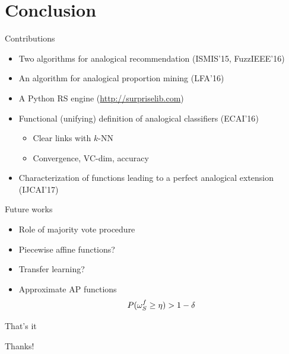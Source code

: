 \documentclass{beamer}
\begin{document}
\section*{Conclusion}

\begin{frame}{Contributions}
  \begin{itemize}
    \item Two algorithms for analogical recommendation (\alert{ISMIS'15},
      \alert{FuzzIEEE'16})
    \item An algorithm for analogical proportion mining (\alert{LFA'16})
    \item A Python RS engine (\url{http://surpriselib.com})
    \item Functional (unifying) definition of analogical classifiers
      (\alert{ECAI'16})
      \begin{itemize}
        \item Clear links with $k$-NN
        \item Convergence, VC-dim, accuracy
      \end{itemize}
    \item Characterization of functions leading to a perfect analogical
      extension (\alert{IJCAI'17})
  \end{itemize}
\end{frame}

\begin{frame}{Future works}
  \begin{itemize}
    \item Role of majority vote procedure
    \item Piecewise affine functions?
    \item Transfer learning?
    \item Approximate AP functions
      $$P(\omega_{S}^{f} \geq \eta) > 1 - \delta$$
  \end{itemize}
\end{frame}

\begin{frame}{That's it}
  \begin{center}
    Thanks!
  \end{center}
\end{frame}



\end{document}
